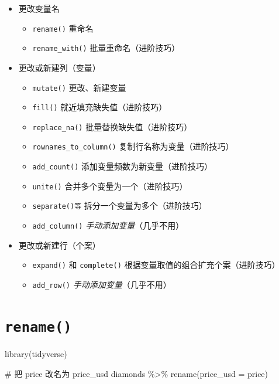 \documentclass[
  letterpaper,
]{ctexbook}
\newenvironment{Shaded}{\begin{snugshade}}{\end{snugshade}}
\newcommand{\AttributeTok}[1]{\textcolor[rgb]{0.40,0.45,0.13}{#1}}
\newcommand{\CommentTok}[1]{\textcolor[rgb]{0.37,0.37,0.37}{#1}}
\newcommand{\FunctionTok}[1]{\textcolor[rgb]{0.28,0.35,0.67}{#1}}
\newcommand{\NormalTok}[1]{\textcolor[rgb]{0.00,0.23,0.31}{#1}}
\newcommand{\SpecialCharTok}[1]{\textcolor[rgb]{0.37,0.37,0.37}{#1}}
\providecommand{\tightlist}{%
  \setlength{\itemsep}{0pt}\setlength{\parskip}{0pt}}\usepackage{longtable,booktabs,array}
\begin{document}
\begin{itemize}
\tightlist
\item
  更改变量名

  \begin{itemize}
  \tightlist
  \item
    \texttt{rename()} 重命名
  \item
    \texttt{rename\_with()} 批量重命名{（进阶技巧）}
  \end{itemize}
\item
  更改或新建列（变量）

  \begin{itemize}
  \tightlist
  \item
    \texttt{mutate()} 更改、新建变量
  \item
    \texttt{fill()} 就近填充缺失值{（进阶技巧）}
  \item
    \texttt{replace\_na()} 批量替换缺失值{（进阶技巧）}
  \item
    \texttt{rownames\_to\_column()} 复制行名称为变量{（进阶技巧）}
  \item
    \texttt{add\_count()} 添加变量频数为新变量{（进阶技巧）}
  \item
    \texttt{unite()} 合并多个变量为一个{（进阶技巧）}
  \item
    \texttt{separate()等} 拆分一个变量为多个{（进阶技巧）}
  \item
    \texttt{add\_column()} \emph{手动添加变量}{（几乎不用）}
  \end{itemize}
\item
  更改或新建行（个案）

  \begin{itemize}
  \tightlist
  \item
    \texttt{expand()} 和 \texttt{complete()}
    根据变量取值的组合扩充个案{（进阶技巧）}
  \item
    \texttt{add\_row()} \emph{手动添加变量}{（几乎不用）}
  \end{itemize}
\end{itemize}

\hypertarget{rename}{%
\section{\texorpdfstring{\texttt{rename()}}{rename()}}\label{rename}}

\begin{Shaded}
\begin{Highlighting}[]
\FunctionTok{library}\NormalTok{(tidyverse)}

\CommentTok{\# 把 price 改名为 price\_usd}
\NormalTok{diamonds }\SpecialCharTok{\%\textgreater{}\%}
  \FunctionTok{rename}\NormalTok{(}\AttributeTok{price\_usd =}\NormalTok{ price)}
\end{Highlighting}
\end{Shaded}
\end{document}
